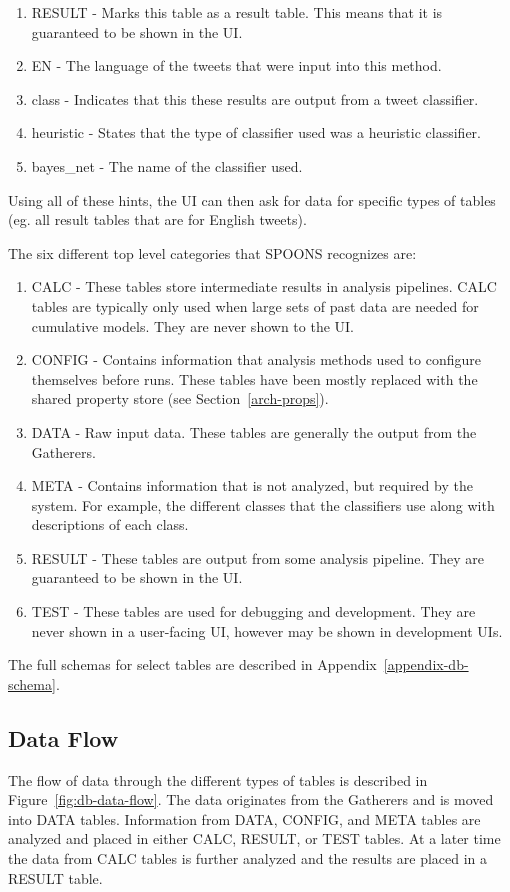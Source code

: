 \documentclass[12pt]{ucthesis}
\begin{document}
\begin{enumerate}
   \item RESULT - Marks this table as a result table. This means that it is guaranteed to be shown in the UI.
   \item EN - The language of the tweets that were input into this method.
   \item class - Indicates that this these results are output from a tweet classifier.
   \item heuristic - States that the type of classifier used was a heuristic classifier.
   \item bayes\_net - The name of the classifier used.
\end{enumerate}

Using all of these hints, the UI can then ask for data for specific types of tables (eg. all result tables that are for English tweets).

The six different top level categories that SPOONS recognizes are:

\begin{enumerate}
   \item CALC - These tables store intermediate results in analysis pipelines. CALC tables are typically only used when large sets of past data are needed for cumulative models. They are never shown to the UI.
   \item CONFIG - Contains information that analysis methods used to configure themselves before runs. These tables have been mostly replaced with the shared property store (see Section~\ref{arch-props}).
   \item DATA - Raw input data. These tables are generally the output from the Gatherers.
   \item META - Contains information that is not analyzed, but required by the system. For example, the different classes that the classifiers use along with descriptions of each class.
   \item RESULT - These tables are output from some analysis pipeline. They are guaranteed to be shown in the UI.
   \item TEST - These tables are used for debugging and development. They are never shown in a user-facing UI, however may be shown in development UIs.
\end{enumerate}

The full schemas for select tables are described in Appendix~\ref{appendix-db-schema}.

\subsection{Data Flow}
\label{arch-database-data-flow}
The flow of data through the different types of tables is described in Figure~\ref{fig:db-data-flow}.
The data originates from the Gatherers and is moved into DATA tables. Information from
DATA, CONFIG, and META tables are analyzed and placed in either CALC, RESULT, or TEST tables.
At a later time the data from CALC tables is further analyzed and the results are placed in a RESULT table.
\end{document}
